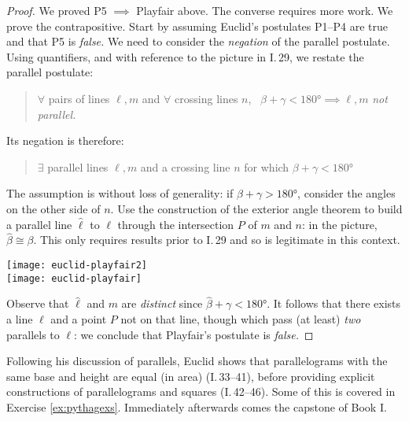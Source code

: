 \begin{proof}
	We proved P5 $\implies$ Playfair above. The converse requires more work.\medbreak
	We prove the contrapositive. Start by assuming Euclid's postulates P1--P4 are true and that P5 is \emph{false.} We need to consider the \emph{negation} of the parallel postulate. Using quantifiers, and with reference to the picture in I.\,29, we restate the parallel postulate:
	\begin{quote}
	  $\forall$ pairs of lines $\ell,m$ and $\forall$ crossing lines $n$, \  $\beta+\gamma<\ang{180}\implies\ell,m$ \emph{not parallel.}
	\end{quote}
	\begin{minipage}[t]{0.62\linewidth}\vspace{-7pt}
		Its negation is therefore:
		\begin{quote}
	  	$\exists$ parallel lines $\ell,m$ and a crossing line $n$ for which $\beta+\gamma<\ang{180}$
		\end{quote}
		The assumption is without loss of generality: if $\beta+\gamma>\ang{180}$, consider the angles on the other side of $n$.\medbreak
		Use the construction of the exterior angle theorem to build a parallel line $\hat\ell$ to $\ell$ through the intersection $P$ of $m$ and $n$: in the picture, $\hat\beta\cong\beta$. This only requires results prior to I.\,29 and so is legitimate in this context.
	\end{minipage}
	\hfill
	\begin{minipage}[t]{0.37\linewidth}\vspace{0pt}
		\flushright
		\texttt{[image: euclid-playfair2]}\\
		\texttt{[image: euclid-playfair]}
	\end{minipage}\medbreak
	Observe that $\hat\ell$ and $m$ are \emph{distinct} since $\hat\beta+\gamma<\ang{180}$.
	It follows that there exists a line $\ell$ and a point $P$ not on that line, though which pass (at least) \emph{two} parallels to $\ell$: we conclude that Playfair's postulate is \emph{false.}
\end{proof}

\goodbreak



Following his discussion of parallels, Euclid shows that parallelograms with the same base and height are equal (in area) (I.\,33--41), before providing explicit constructions of parallelograms and squares (I.\,42--46). Some of this is covered in Exercise \ref{ex:pythagexs}. Immediately afterwards comes the capstone of Book I.


